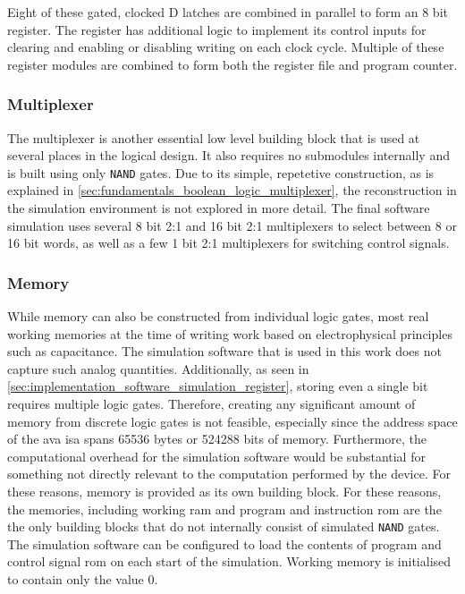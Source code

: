 Eight of these gated, clocked D latches are combined in parallel to form an 8 bit register. The register has additional logic to implement its control inputs for clearing and enabling or disabling writing on each clock cycle. Multiple of these register modules are combined to form both the register file and program counter.

\subsubsection{Multiplexer}

The multiplexer is another essential low level building block that is used at several places in the logical design. It also requires no submodules internally and is built using only \texttt{NAND} gates. Due to its simple, repetetive construction, as is explained in \autoref{sec:fundamentals_boolean_logic_multiplexer}, the reconstruction in the simulation environment is not explored in more detail. The final software simulation uses several 8 bit 2:1 and 16 bit 2:1 multiplexers to select between 8 or 16 bit words, as well as a few 1 bit 2:1 multiplexers for switching control signals.

\subsubsection{Memory}

While memory can also be constructed from individual logic gates, most real working memories at the time of writing work based on electrophysical principles such as capacitance. The simulation software that is used in this work does not capture such analog quantities. Additionally, as seen in \autoref{sec:implementation_software_simulation_register}, storing even a single bit requires multiple logic gates. Therefore, creating any significant amount of memory from discrete logic gates is not feasible, especially since the address space of the \ac{ava} \ac{isa} spans 65536 bytes or 524288 bits of memory. Furthermore, the computational overhead for the simulation software would be substantial for something not directly relevant to the computation performed by the device. For these reasons, memory is provided as its own building block. For these reasons, the memories, including working \ac{ram} and program and instruction \ac{rom} are the the only building blocks that do not internally consist of simulated \texttt{NAND} gates. The simulation software can be configured to load the contents of program and control signal \ac{rom} on each start of the simulation. Working memory is initialised to contain only the value 0.

